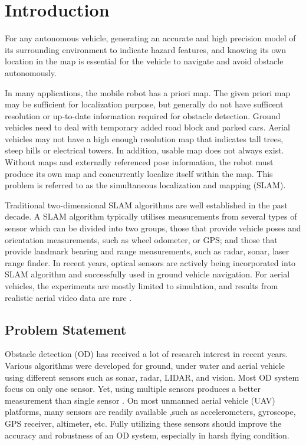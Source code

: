 \chapter{Introduction} \label{ch:intro}
For any autonomous vehicle, generating an accurate and high precision model of its surrounding 
environment to indicate hazard features, and knowing its own location in the map is essential for 
the vehicle to navigate and avoid obstacle autonomously. 

In many applications, the mobile robot has a priori map. The given 
priori map may be sufficient for localization purpose, but generally do 
not have sufficent resolution or up-to-date information required for obstacle detection. Ground vehicles 
need to deal with temporary added road block and parked cars. Aerial 
vehicles may not have a high enough resolution map that indicates tall 
trees, steep hills or electrical towers. In addition, usable map does not 
always exist. Without maps and externally referenced pose information, 
the robot must produce its own map and concurrently localize itself 
within the map. This problem is referred to as the simultaneous 
localization and mapping (SLAM). 

Traditional two-dimensional SLAM algorithms are well established in the past
decade. A SLAM algorithm typically utilises measurements from several
types of sensor which can be divided into two groups, those that
provide vehicle poses and orientation measurements, such as wheel
odometer, or GPS; and those that provide landmark bearing and range
measurements, such as radar, sonar, laser range finder. In recent
years, optical sensors are actively being incorporated into SLAM
algorithm and successfully used in ground vehicle navigation. For
aerial vehicles, the experiments are mostly limited to simulation, and
results from realistic aerial video data are rare \cite{nemra_robust_2010}
\cite{jianli_unscented_2011} \cite{sunderhauf_using_2007} \cite{artieda_visual_2009}.

\section{Problem Statement}\label{section:ProblemStatement}
Obstacle detection (OD) has received a lot of research interest in recent
years. Various algorithms were developed for ground, under water and
aerial vehicle using different sensors such as sonar, radar, LIDAR, and
vision. Most OD system focus on only one sensor. Yet, using multiple sensors produces a better
measurement than single sensor \cite{smith_approaches_2006}. On most unmanned aerial vehicle (UAV) platforms, many sensors are readily available ,such as accelerometers, gyroscope, GPS receiver, altimeter, etc.
Fully utilizing these sensors should improve the accuracy and robustness of an OD system, especially in harsh flying condition.

